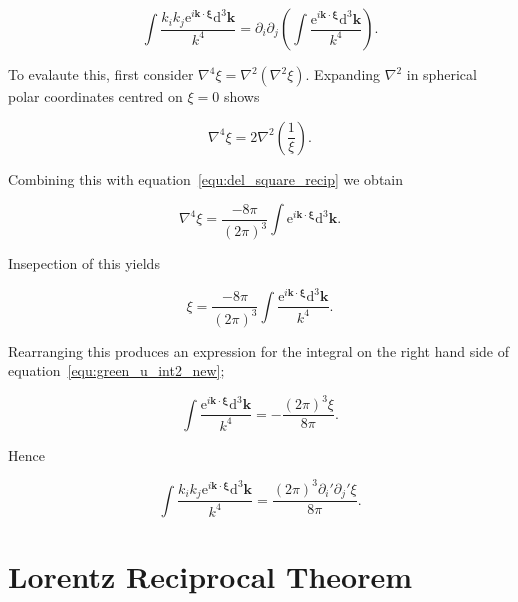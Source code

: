 \documentclass[12pt]{article}
\begin{document}
\begin{equation}
\label{equ:green_u_int2_new}
\int \frac{k_{i} k_{j} \mathrm{e}^{i \boldsymbol{k} \cdot \boldsymbol{\xi}} \mathrm{d}^{3} \boldsymbol{k}}{k^{4}} = \partial_{i} \partial_{j} \left(\int \frac{\mathrm{e}^{i \boldsymbol{k} \cdot \boldsymbol{\xi}} \mathrm{d}^{3} \boldsymbol{k}}{k^{4}} \right) .
\end{equation}

To evalaute this, first consider $\nabla^{4} \xi = \nabla^{2}(\nabla^{2} \xi)$. Expanding $\nabla^{2}$ in spherical polar coordinates centred on $\xi = 0$ shows

\begin{equation}
\label{equ:del4}
\nabla^{4} \xi = 2 \nabla^{2} \left(\frac{1}{\xi}\right) .
\end{equation}

Combining this with equation~\ref{equ:del_square_recip} we obtain

\begin{equation}
\label{equ:del4_int}
\nabla^{4} \xi = \frac{-8 \pi}{(2 \pi)^{3}} \int \mathrm{e}^{i \boldsymbol{k} \cdot \boldsymbol{\xi}} \mathrm{d}^{3} \boldsymbol{k} .
\end{equation}

Insepection of this yields

\begin{equation}
\label{equ:del4_int_int}
\xi = \frac{-8 \pi}{(2 \pi)^{3}} \int \frac{\mathrm{e}^{i \boldsymbol{k} \cdot \boldsymbol{\xi}} \mathrm{d}^{3} \boldsymbol{k}}{k^{4}} .
\end{equation}

Rearranging this produces an expression for the integral on the right hand side of equation~\ref{equ:green_u_int2_new};

\begin{equation}
\label{equ:green_u_int2_new_express}
\int \frac{\mathrm{e}^{i \boldsymbol{k} \cdot \boldsymbol{\xi}} \mathrm{d}^{3} \boldsymbol{k}}{k^{4}} = -\frac{(2 \pi)^{3} \xi}{8 \pi} .
\end{equation}

Hence

\begin{equation}
\label{equ:green_u_int2}
\int \frac{k_{i} k_{j} \mathrm{e}^{i \boldsymbol{k} \cdot \boldsymbol{\xi}} \mathrm{d}^{3} \boldsymbol{k}}{k^{4}} = \frac{(2 \pi)^{3} \partial_{i}' \partial_{j}' \xi}{8 \pi} .
\end{equation}


\section{Lorentz Reciprocal Theorem}
\label{app:Lorentz}
\end{document}
